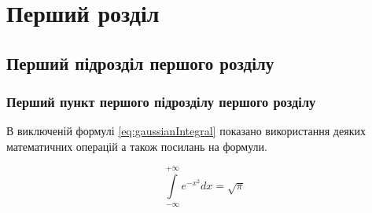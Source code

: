 \chapter{Перший розділ} 
\label{chapter:first}

\section{Перший підрозділ першого розділу}

\subsection{Перший пункт першого підрозділу першого розділу}

В виключеній формулі \ref{eq:gaussianIntegral} показано використання деяких математичних операцій а також посилань на формули.

\begin{equation}
\label{eq:gaussianIntegral}
\int\limits^{+\infty}_{-\infty} e^{-x^2} dx = \sqrt{\pi} 
\end{equation}